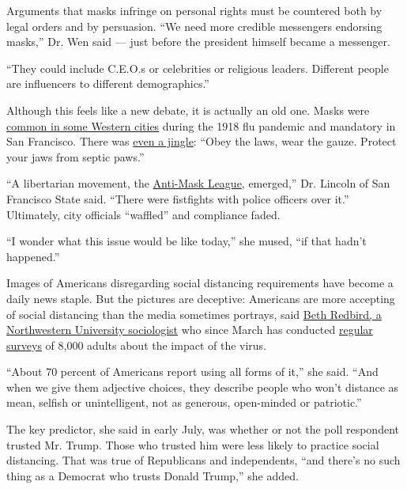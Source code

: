 Arguments that masks infringe on personal rights must be countered both
by legal orders and by persuasion. ``We need more credible messengers
endorsing masks,'' Dr. Wen said --- just before the president himself
became a messenger.

``They could include C.E.O.s or celebrities or religious leaders.
Different people are influencers to different demographics.''

Although this feels like a new debate, it is actually an old one. Masks
were
\href{https://www.history.com/news/1918-spanish-flu-mask-wearing-resistance}{common
in some Western cities} during the 1918 flu pandemic and mandatory in
San Francisco. There was
\href{https://www.pbs.org/wgbh/americanexperience/features/influenza-san-francisco/\#:~:text=One\%20of\%20the\%20more\%20highly,the\%20spread\%20of\%20flu\%20germs.\&text=A\%20Mask\%20is\%2099\%25\%20Proof,laws\%2C\%20and\%20wear\%20the\%20gauze.}{even
a jingle}: ``Obey the laws, wear the gauze. Protect your jaws from
septic paws.''

``A libertarian movement, the
\href{https://en.wikipedia.org/wiki/Anti-Mask_League_of_San_Francisco}{Anti-Mask
League}, emerged,'' Dr. Lincoln of San Francisco State said. ``There
were fistfights with police officers over it.'' Ultimately, city
officials ``waffled'' and compliance faded.

``I wonder what this issue would be like today,'' she mused, ``if that
hadn't happened.''

Images of Americans disregarding social distancing requirements have
become a daily news staple. But the pictures are deceptive: Americans
are more accepting of social distancing than the media sometimes
portrays, said
\href{https://magazine.northwestern.edu/exclusives/covid-19-impact-research/}{Beth
Redbird, a Northwestern University sociologist} who since March has
conducted \href{https://coronadata.us/data/}{regular surveys} of 8,000
adults about the impact of the virus.

``About 70 percent of Americans report using all forms of it,'' she
said. ``And when we give them adjective choices, they describe people
who won't distance as mean, selfish or unintelligent, not as generous,
open-minded or patriotic.''

The key predictor, she said in early July, was whether or not the poll
respondent trusted Mr. Trump. Those who trusted him were less likely to
practice social distancing. That was true of Republicans and
independents, ``and there's no such thing as a Democrat who trusts
Donald Trump,'' she added.


